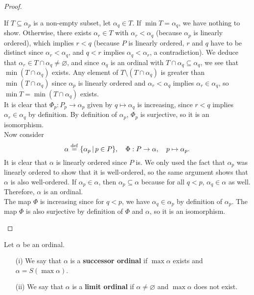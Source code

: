 \begin{proof}
\begin{itemize}
        If $T \subseteq \alpha_p$ is a non-empty subset, let $\alpha_q \in T$. If $\min T = \alpha_q$, we have nothing to show. Otherwise, there exists $\alpha_r \in T$ with $\alpha_r < \alpha_q$ (because $\alpha_p$ is linearly ordered), which implies $r < q$ (because $P$ is linearly ordered, $r$ and $q$ have to be distinct since $\alpha_r < \alpha_q$, and $q < r$ implies $\alpha_q < \alpha_r$, a contradiction). We deduce that $\alpha_r \in T \cap \alpha_q \neq \varnothing$, and since $\alpha_q$ is an ordinal with $T \cap \alpha_q \subseteq \alpha_q$, we see that $\min(T \cap \alpha_q)$ exists. Any element of $T \setminus (T \cap \alpha_q)$ is greater than $\min(T \cap \alpha_q)$ since $\alpha_p$ is linearly ordered and $\alpha_r < \alpha_q$ implies $\alpha_r \in \alpha_q$, so $\min T = \min(T \cap \alpha_q)$ exists.
        \\

        It is clear that $\Phi_p : P_p \to \alpha_p$ given by $q \mapsto \alpha_q$ is increasing, since $r < q$ implies $\alpha_r \in \alpha_q$ by definition. By definition of $\alpha_p$, $\Phi_p$ is surjective, so it is an isomorphism. 
        \\

        Now consider 
        \[
            \alpha \overset{\mathrm{def}}{=} \{ \alpha_p \, | \, p \in P \}, \quad \Phi : P \to \alpha, \quad p \mapsto \alpha_p.     
        \]
        It is clear that $\alpha$ is linearly ordered since $P$ is. We only used the fact that $\alpha_p$ was linearly ordered to show that it is well-ordered, so the same argument shows that $\alpha$ is also well-ordered. If $\alpha_p \in \alpha$, then $\alpha_p \subseteq \alpha$ because for all $q < p$, $\alpha_q \in \alpha$ as well. Therefore, $\alpha$ is an ordinal. 
        \\

        The map $\Phi$ is increasing since for $q < p$, we have $\alpha_q \in \alpha_p$ by definition of $\alpha_p$. The map $\Phi$ is also surjective by definition of $\Phi$ and $\alpha$, so it is an isomorphism. 
    \end{itemize}
\end{proof}

\begin{definition} \label{successor-and-limit-ordinals}
    Let $\alpha$ be an ordinal.
    \\

    \begin{itemize}
        \item[(i)] We say that $\alpha$ is a \textbf{successor ordinal} if $\max \alpha$ exists and $\alpha = S(\max \alpha)$.
        \\
        
        \item[(ii)] We say that $\alpha$ is a \textbf{limit ordinal} if $\alpha \neq \varnothing$ and $\max \alpha$ does not exist.
        \\

    \end{itemize}
\end{definition}


